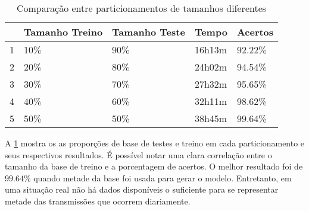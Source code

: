 \begin{table}[h]
    \centering
    \caption{Comparação entre particionamentos de tamanhos diferentes}
    \label{tab:partic}
    \begin{tabular}{l|l|l|l|l|}
        \cline{2-5}
                                                        & \multicolumn{1}{c|}{\cellcolor[HTML]{EFEFEF}Tamanho Treino} & \multicolumn{1}{c|}{\cellcolor[HTML]{EFEFEF}Tamanho Teste} & \multicolumn{1}{c|}{\cellcolor[HTML]{EFEFEF}Tempo} & \multicolumn{1}{c|}{\cellcolor[HTML]{EFEFEF}Acertos} \\ \hline
        \multicolumn{1}{|l|}{\cellcolor[HTML]{EFEFEF}1} & 10\%                                                        & 90\%                                                       & 16h13m                                             & 92.22\%                                               \\ \hline
        \multicolumn{1}{|l|}{\cellcolor[HTML]{EFEFEF}2} & 20\%                                                        & 80\%                                                       & 24h02m                                             & 94.54\%                                               \\ \hline
        \multicolumn{1}{|l|}{\cellcolor[HTML]{EFEFEF}3} & 30\%                                                        & 70\%                                                       & 27h32m                                             & 95.65\%                                               \\ \hline
        \multicolumn{1}{|l|}{\cellcolor[HTML]{EFEFEF}4} & 40\%                                                        & 60\%                                                       & 32h11m                                             & 98.62\%                                               \\ \hline
        \multicolumn{1}{|l|}{\cellcolor[HTML]{EFEFEF}5} & 50\%                                                        & 50\%                                                       & 38h45m                                             & 99.64\%                                               \\ \hline
    \end{tabular}
\end{table}

\par A \ref{tab:partic} mostra os as proporções de base de testes e treino em cada particionamento e seus respectivos
resultados. É possível notar uma clara correlação entre o tamanho da base de treino e a porcentagem de acertos. O
melhor resultado foi de $99.64$\% quando metade da base foi usada para gerar o modelo. Entretanto, em uma situação real
não há dados disponíveis o suficiente para se representar metade das transmissões que ocorrem diariamente.


